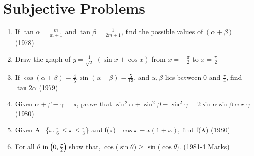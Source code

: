 \documentclass[journal,12pt,twocolumn]{IEEEtran}
\theoremstyle{remark}
\begin{document}
\section{Subjective Problems}
\begin{enumerate}
\item If $\tan{\alpha}=\frac{m}{m+1}$ and $\tan{\beta}=\frac{1}{2m+1}$, find the possible values of $(\alpha+\beta)$ \hfill(1978)
    \item Draw the graph of $y=\frac{1}{\sqrt{2}}$ $(\sin {x}+\cos {x})$ from $x=-\frac{\pi}{2}$ to $x=\frac{\pi}{2}$
    \item If $\cos{(\alpha+\beta)}=\frac{4}{5}$,$\sin{(\alpha-\beta)}=\frac{5}{13}$, and $\alpha,\beta$ lies between 0 and $\frac{\pi}{4}$, find $\tan{2\alpha}$ \hfill(1979)
\item Given $\alpha+\beta-\gamma=\pi$, prove that $\sin^2{\alpha}+\sin^2{\beta}-\sin^2{\gamma}=2\sin{\alpha}\sin{\beta}\cos{\gamma}$ \hfill(1980)
\item Given A=\{$x:\frac{\pi}{6}\le x\le\frac{\pi}{3}$\} and f(x)=$\cos{x-x(1+x)}$; find f(A) \hfill(1980)

\item For all $\theta$ in $\left(0, \frac{\pi}{2}\right)$ show that, $\cos{(\sin{\theta)}}\geq
\sin{(\cos{\theta)}}.$ \hfill(1981-4 Marks)
\end{enumerate}
\end{document}
